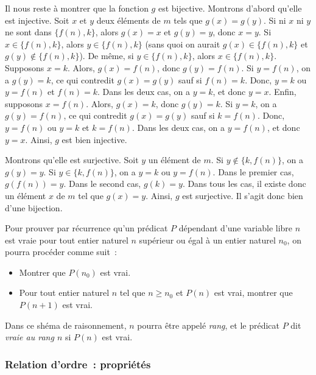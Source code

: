     Il nous reste à montrer que la fonction $g$ est bijective. 
    Montrons d'abord qu'elle est injective. 
    Soit $x$ et $y$ deux éléments de $m$ tels que $g(x) = g(y)$.
    Si ni $x$ ni $y$ ne sont dans $\lbrace f(n), k \rbrace$, alors $g(x) = x$ et $g(y) = y$, donc $x=y$. 
    Si $x \in \lbrace f(n), k \rbrace$, alors $y \in \lbrace f(n), k \rbrace$ (sans quoi on aurait $g(x) \in \lbrace f(n), k \rbrace$ et $g(y) \notin \lbrace f(n), k \rbrace$). 
    De même, si $y \in \lbrace f(n), k \rbrace$, alors $x \in \lbrace f(n), k \rbrace$. 
    Supposons $x = k$. 
    Alors, $g(x) = f(n)$, donc $g(y) = f(n)$. 
    Si $y = f(n)$, on a $g(y) = k$, ce qui contredit $g(x) = g(y)$ sauf si $f(n) = k$. 
    Donc, $y = k$ ou $y = f(n)$ et $f(n) = k$. 
    Dans les deux cas, on a $y = k$, et donc $y = x$. 
    Enfin, supposons $x = f(n)$. 
    Alors, $g(x) = k$, donc $g(y) = k$. 
    Si $y = k$, on a $g(y) = f(n)$, ce qui contredit $g(x) = g(y)$ sauf si $k = f(n)$. 
    Donc, $y = f(n)$ ou $y = k$ et $k = f(n)$. 
    Dans les deux cas, on a $y = f(n)$, et donc $y = x$. 
    Ainsi, $g$ est bien injective. 

    Montrons qu'elle est surjective. 
    Soit $y$ un élément de $m$. 
    Si $y \notin \lbrace k, f(n) \rbrace$, on a $g(y) = y$. 
    Si $y \in \lbrace k, f(n) \rbrace$, on a $y = k$ ou $y = f(n)$. 
    Dans le premier cas, $g(f(n)) = y$. 
    Dans le second cas, $g(k) = y$. 
    Dans tous les cas, il existe donc un élément $x$ de $m$ tel que $g(x) = y$. 
    Ainsi, $g$ est surjective. 
    Il s'agit donc bien d'une bijection. 

   \done 

\medskip

Pour prouver par récurrence qu'un prédicat $P$ dépendant d'une variable libre $n$ est vraie pour tout entier naturel $n$ supérieur ou égal à un entier naturel $n_0$, on pourra procéder comme suit : 
\begin{itemize}[nosep]
    \item Montrer que $P(n_0)$ est vrai.
    \item Pour tout entier naturel $n$ tel que $n \geq n_0$ et $P(n)$ est vrai, montrer que $P(n+1)$ est vrai.
\end{itemize}
Dans ce shéma de raisonnement, $n$ pourra être appelé \textit{rang}, et le prédicat $P$ dit \textit{vraie au rang $n$} si $P(n)$ est vrai.

\subsubsection{Relation d'ordre : propriétés}
\label{subsub:relOrdreProps}

